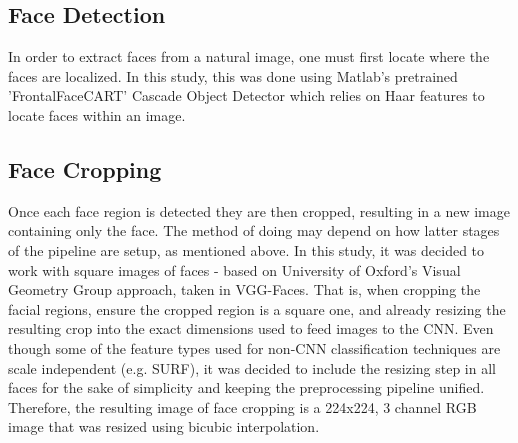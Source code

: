 \documentclass[11pt]{article}
\begin{document}
        \subsection{Face Detection}
            In order to extract faces from a natural image, one must first locate where the faces are localized. In this study, this was done using Matlab's pretrained 'FrontalFaceCART' Cascade Object Detector which relies on Haar features to locate faces within an image.

        \subsection{Face Cropping}
            Once each face region is detected they are then cropped, resulting in a new image containing only the face. The method of doing may depend on how latter stages of the pipeline are setup, as mentioned above. In this study, it was decided to work with square images of faces - based on University of Oxford's Visual Geometry Group approach, taken in VGG-Faces. That is, when cropping the facial regions, ensure the cropped region is a square one, and already resizing the resulting crop into the exact dimensions used to feed images to the CNN. Even though some of the feature types used for non-CNN classification techniques are scale independent (e.g. SURF), it was decided to include the resizing step in all faces for the sake of simplicity and keeping the preprocessing pipeline unified. Therefore, the resulting image of face cropping is a 224x224, 3 channel RGB image that was resized using bicubic interpolation.
\end{document}
